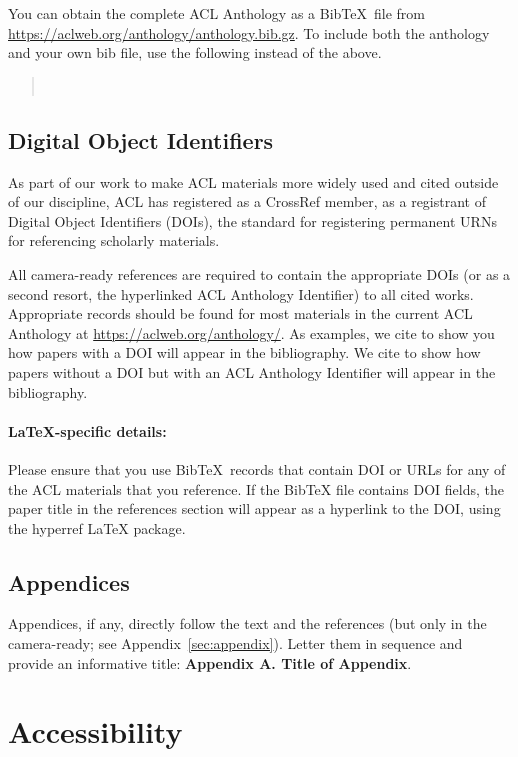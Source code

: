 \documentclass[11pt,a4paper]{article}
\begin{document}
You can obtain the complete ACL Anthology as a Bib\TeX\ file from \url{https://aclweb.org/anthology/anthology.bib.gz}.
To include both the anthology and your own bib file, use the following instead of the above.
\begin{quote}\small
\verb||\\
\verb||
\end{quote}


\subsection{Digital Object Identifiers}
As part of our work to make ACL materials more widely used and cited outside of our discipline, ACL has registered as a CrossRef member, as a registrant of Digital Object Identifiers (DOIs), the standard for registering permanent URNs for referencing scholarly materials.

All camera-ready references are required to contain the appropriate DOIs (or as a second resort, the hyperlinked ACL Anthology Identifier) to all cited works.
Appropriate records should be found for most materials in the current ACL Anthology at \url{https://aclweb.org/anthology/}.
As examples, we cite \citep{goodman-etal-2016-noise} to show you how papers with a DOI will appear in the bibliography.
We cite \citep{harper-2014-learning} to show how papers without a DOI but with an ACL Anthology Identifier will appear in the bibliography.

\paragraph{\LaTeX-specific details:}
Please ensure that you use Bib\TeX\ records that contain DOI or URLs for any of the ACL materials that you reference.
If the Bib\TeX{} file contains DOI fields, the paper title in the references section will appear as a hyperlink to the DOI, using the hyperref \LaTeX{} package.


\subsection{Appendices}
Appendices, if any, directly follow the text and the
references (but only in the camera-ready; see Appendix~\ref{sec:appendix}).
Letter them in sequence and provide an informative title:
\textbf{Appendix A. Title of Appendix}.

\section{Accessibility}
\label{ssec:accessibility}
\end{document}
